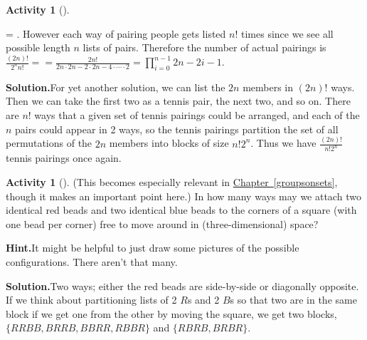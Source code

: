 \documentclass[10pt,]{book}
\theoremstyle{plain}
\theoremstyle{definition}
\newtheorem{activity}[project]{Activity}
\numberwithin{equation}{chapter}
\begin{document}
\begin{activity}[]
\begin{enumerate}[label=(\alph*)]
= \). However each way of pairing people gets listed \(n!\) times since we see all possible length \(n\) lists of pairs. Therefore the number of actual pairings is \(\frac{(2n)!}{2^n n!}= =\frac{2n!}{2n\cdot2n-2\cdot2n-4\cdot \cdots\cdot 2} =  \prod_{i=0}^{n-1} 2n-2i-1\).%
\par\medskip\noindent%
\textbf{Solution.}\quad For yet another solution, we can list the \(2n\) members in \((2n)!\) ways. Then we can take the first two as a tennis pair, the next two, and so on. There are \(n!\) ways that a given set of tennis pairings could be arranged, and each of the \(n\) pairs could appear in 2 ways, so the tennis pairings partition the set of all permutations of the \(2n\) members into blocks of size \(n!2^n\). Thus we have \(\frac{(2n)!}{n!2^n}\) tennis pairings once again.%

\end{enumerate}
\end{activity}
\begin{activity}[]\label{twocolorsofbeads}
(This becomes especially relevant in \hyperref[groupsonsets]{Chapter~\ref{groupsonsets}}, though it makes an important point here.) In how many ways may we attach two identical red beads and two identical blue beads to the corners of a square (with one bead per corner) free to move around in (three-dimensional) space?%
\par\medskip\noindent%
\textbf{Hint.}\quad It might be helpful to just draw some pictures of the possible configurations. There aren’t that many.%
\par\medskip\noindent%
\textbf{Solution.}\quad Two ways; either the red beads are side-by-side or diagonally opposite. If we think about partitioning lists of 2 \(R\)s and 2 \(B\)s so that two are in the same block if we get one from the other by moving the square, we get two blocks, \(\{RRBB, BRRB, BBRR, RBBR\}\) and \(\{RBRB, BRBR\}\).%
\end{activity}
\end{document}
